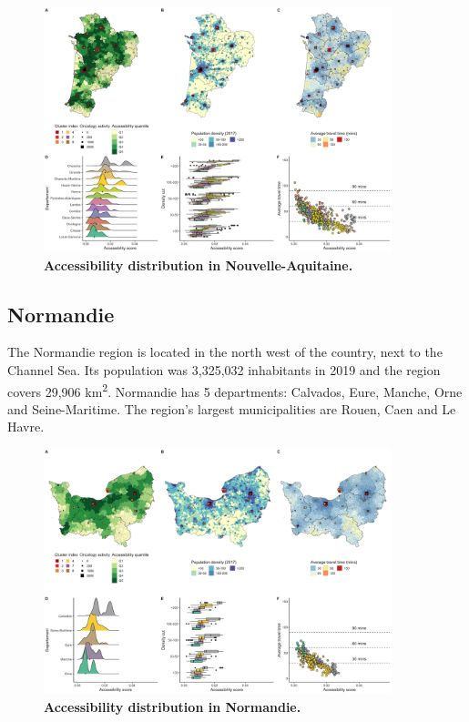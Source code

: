 \begin{figure}[H]
    \includegraphics[width=0.9\textwidth]{images/camion/region_accessibility/accessibility_Nouvelle-Aquitaine.png}
    \centering
    \caption{
        \textbf{Accessibility distribution in Nouvelle-Aquitaine.}
    }
\end{figure}

\subsection*{Normandie}

The Normandie region is located in the north west of the country, next to the
Channel Sea. Its population was 3,325,032 inhabitants in 2019 and the region
covers 29,906 km\textsuperscript{2}. Normandie has 5 departments: Calvados,
Eure, Manche, Orne and Seine-Maritime. The region's largest municipalities are
Rouen, Caen and Le Havre.

\begin{figure}[H]
    \includegraphics[width=0.9\textwidth]{images/camion/region_accessibility/accessibility_Normandie.png}
    \centering
    \caption{
        \textbf{Accessibility distribution in Normandie.}
    }
\end{figure}

